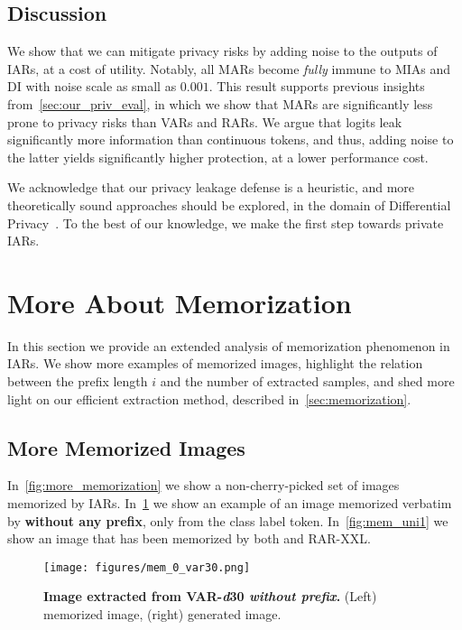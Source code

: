 \subsection{Discussion}

We show that we can mitigate privacy risks by adding noise to the outputs of IARs, at a cost of utility. Notably, all MARs become \textit{fully} immune to MIAs and DI with noise scale as small as $0.001$. This result supports previous insights from~\cref{sec:our_priv_eval}, in which we show that MARs are significantly less prone to privacy risks than VARs and RARs. We argue that logits leak significantly more information than continuous tokens, and thus, adding noise to the latter yields significantly higher protection, at a lower performance cost.

We acknowledge that our privacy leakage defense is a heuristic, and more theoretically sound approaches should be explored, \eg in the domain of Differential Privacy~\citep{dwork2006differential}. To the best of our knowledge, we make the first step towards private IARs.

\section{More About Memorization}
\label{app:more_memorization}

In this section we provide an extended analysis of memorization phenomenon in IARs. We show more examples of memorized images, highlight the relation between the prefix length $i$ and the number of extracted samples, and shed more light on our efficient extraction method, described in~\cref{sec:memorization}.

\subsection{More Memorized Images}
\label{app:more_memorization_images}
In~\cref{fig:more_memorization} we show a non-cherry-picked set of images memorized by IARs. In~\cref{fig:var30_mem_zero} we show an example of an image memorized verbatim by \varbig \textbf{without any prefix}, \ie only from the class label token. In~\cref{fig:mem_uni1} we show an image that has been memorized by both \varbig and RAR-XXL.

\begin{figure}[h]
    \centering
    \texttt{[image: figures/mem\_0\_var30.png]}
    \caption{\textbf{Image extracted from VAR-\textit{d}30 \textit{without prefix}.} (Left) memorized image, (right) generated image.}
    \label{fig:var30_mem_zero}
\end{figure}

